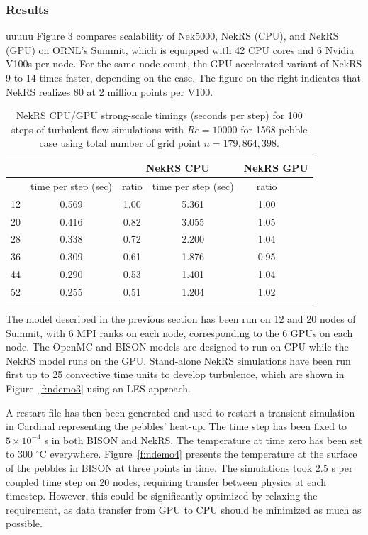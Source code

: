 \subsubsection{Results}
uuuuu
Figure 3 compares scalability of
Nek5000, NekRS (CPU), and NekRS (GPU) on ORNL’s Summit, which is equipped with 42 CPU cores
and 6 Nvidia V100s per node. For the same node count, the GPU-accelerated variant of NekRS 9 to 14
times faster, depending on the case. The figure on the right indicates that NekRS realizes 80%
at 2 million points per V100.


\begin{table}
  \centering
  \begin{tabular}{c|cc|cc}
    \hline \hline
  \multirow{2}{*}{ } &
  \multicolumn{1}{c|}{ } &
  \multicolumn{2}{|c|}{NekRS CPU}  &
  \multicolumn{2}{|c}{NekRS GPU} \\
  \hline \hline
  \cline{2-5}
      &  time per step (sec) & ratio & time per step (sec) & ratio \\
    12 & 0.569 & 1.00 & 5.361  & 1.00\\
    20 & 0.416 & 0.82 & 3.055  & 1.05\\
    28 & 0.338 & 0.72 & 2.200  & 1.04\\
    36 & 0.309 & 0.61 & 1.876  & 0.95\\
    44 & 0.290 & 0.53 & 1.401  & 1.04\\
    52 & 0.255 & 0.51 & 1.204  & 1.02\\
    \hline \hline
  \end{tabular}
  \caption{NekRS CPU/GPU strong-scale timings (seconds per step) for 100 steps of turbulent flow simulations
   with $Re=10000$ for 1568-pebble case using total number of grid point $n=179,864,398$.}
  \label{tab:nekrs}
\end{table}

The model described in the previous section has been run on 12 and 20 nodes of Summit, with 6 MPI ranks on each node, corresponding to the 6 GPUs on each node. The OpenMC and BISON models are designed to run on CPU while the NekRS model runs on the GPU. Stand-alone NekRS simulations have been run first up to 25 convective time units to develop turbulence, which are shown in Figure~\ref{f:ndemo3} using an LES approach.

A restart file has then been generated and used to restart a transient simulation in Cardinal representing the pebbles' heat-up. The time step has been fixed to $5\times 10^{-4}$ s in both BISON and NekRS. The temperature at time zero has been set to 300 $^{\circ}$C everywhere. Figure~\ref{f:ndemo4} presents the temperature at the surface of the pebbles in BISON at three points in time. The simulations took 2.5 s per coupled time step on 20 nodes, requiring transfer between physics at each timestep. However, this could be significantly optimized by relaxing the requirement, as data transfer from GPU to CPU should be minimized as much as possible.

